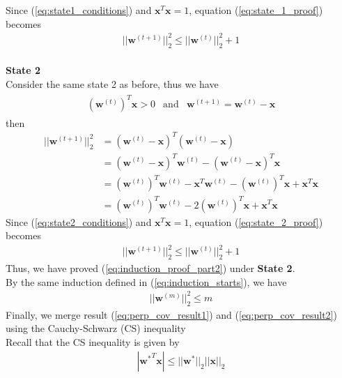 Since (\ref{eq:state1_conditions}) and $\textbf{x}^T\textbf{x} = 1$, equation (\ref{eq:state_1_proof}) becomes
\begin{align}
  ||{\textbf{w}^{(t+1)}}||_{2}^{2} \leq ||{\textbf{w}^{(t)}}||_{2}^{2} + 1
\end{align}\\
\indent \textbf{State 2} \\
Consider the same state 2 as before, thus we have
\begin{align}
  \begin{matrix}
    \label{eq:state2_conditions}
    (\textbf{w}^ {(t)})^T\textbf{x} > 0 & \text{and} & \textbf{w}^ {(t+1)} = \textbf{w}^{(t)} - \textbf{x}
  \end{matrix}
\end{align}
then
\begin{align}
  \nonumber
  ||\textbf{w}^{(t+1)}||_{2}^{2} &= ( \textbf{w}^{(t)} - \textbf{x})^T( \textbf{w}^{(t)} - \textbf{x}) \\
  \nonumber
  &=( \textbf{w}^{(t)} - \textbf{x})^T\textbf{w}^{(t)} - ( \textbf{w}^{(t)} - \textbf{x})^T\textbf{x} \\
  \nonumber
  &= (\textbf{w}^{(t)})^T\textbf{w}^{(t)} - \textbf{x}^T\textbf{w}^{(t)} - (\textbf{w}^{(t)})^T\textbf{x} + \textbf{x}^T\textbf{x}\\
  &= (\textbf{w}^{(t)})^T\textbf{w}^{(t)} - 2 (\textbf{w}^{(t)})^T\textbf{x}  + \textbf{x}^T\textbf{x}
  \label{eq:state_2_proof}
\end{align}
Since (\ref{eq:state2_conditions}) and $\textbf{x}^T\textbf{x} = 1$, equation (\ref{eq:state_2_proof}) becomes
\begin{align}
  ||{\textbf{w}^{(t+1)}}||_{2}^{2} \leq ||{\textbf{w}^{(t)}}||_{2}^{2} + 1
\end{align}
Thus, we have proved (\ref{eq:induction_proof_part2}) under \textbf{State 2}.\\
By the same induction defined in (\ref{eq:induction_starts}), we have
\begin{align}
  \label{eq:perp_cov_result2}
  ||\textbf{w}^{(m)}||_{2}^{2} \leq m
\end{align}
Finally, we merge result (\ref{eq:perp_cov_result1}) and (\ref{eq:perp_cov_result2}) using the Cauchy-Schwarz (CS) inequality \\
Recall that the CS inequality is given by
\begin{align}
  \label{eq:CS_inquality}
  |{\textbf{w}^*}^T\textbf{x}| \leq ||\textbf{w}^{*}||_2 ||\textbf{x}||_2
\end{align}
